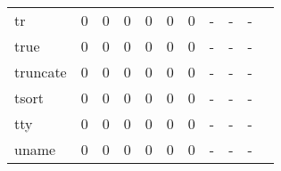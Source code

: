 \begin{longtable}{lp{1.2cm}p{1.2cm}p{1.2cm}p{1.2cm}p{1.2cm}p{1.2cm}p{1.2cm}p{1.2cm}p{1.2cm}p{1.2cm}}
tr        &                                     0 &                                                  0 &                                                  0 &                                                  0 &                                                  0 &                                                  0 &                                                  - &                                                  - &                                                  - \\
true      &                                     0 &                                                  0 &                                                  0 &                                                  0 &                                                  0 &                                                  0 &                                                  - &                                                  - &                                                  - \\
truncate  &                                     0 &                                                  0 &                                                  0 &                                                  0 &                                                  0 &                                                  0 &                                                  - &                                                  - &                                                  - \\
tsort     &                                     0 &                                                  0 &                                                  0 &                                                  0 &                                                  0 &                                                  0 &                                                  - &                                                  - &                                                  - \\
tty       &                                     0 &                                                  0 &                                                  0 &                                                  0 &                                                  0 &                                                  0 &                                                  - &                                                  - &                                                  - \\
uname     &                                     0 &                                                  0 &                                                  0 &                                                  0 &                                                  0 &                                                  0 &                                                  - &                                                  - &                                                  - \\

\end{longtable}
